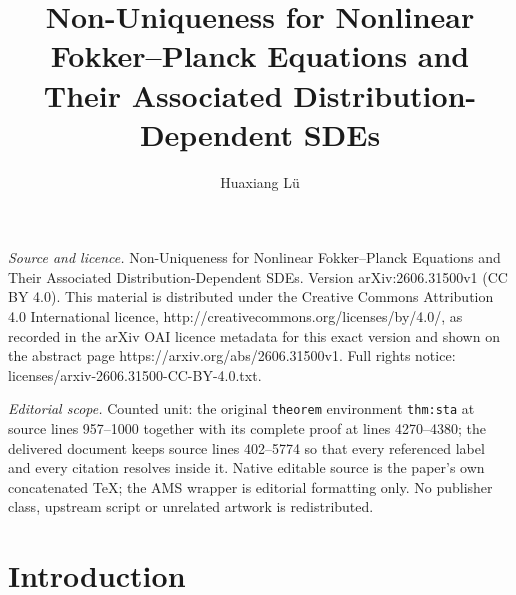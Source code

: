 \documentclass[10pt,a4paper]{amsart}
\numberwithin{equation}{section}
\begin{document}
\title[Non-Uniqueness for Nonlinear Fokker--Planck Equations and Th]{Non-Uniqueness for Nonlinear Fokker--Planck Equations and Their Associated Distribution-Dependent SDEs}
\author{Huaxiang Lü}
\date{}
\maketitle
\noindent\emph{Source and licence.} Non-Uniqueness for Nonlinear Fokker--Planck Equations and Their Associated Distribution-Dependent SDEs. Version arXiv:2606.31500v1 (CC BY 4.0). This material is distributed under the Creative Commons Attribution 4.0 International licence, http://creativecommons.org/licenses/by/4.0/, as recorded in the arXiv OAI licence metadata for this exact version and shown on the abstract page https://arxiv.org/abs/2606.31500v1. Full rights notice: licenses/arxiv-2606.31500-CC-BY-4.0.txt.\par\smallskip
\noindent\textit{Editorial scope.} Counted unit: the original \texttt{theorem} environment \texttt{thm:sta} at source lines 957--1000 together with its complete proof at lines 4270--4380; the delivered document keeps source lines 402--5774 so that every referenced label and every citation resolves inside it. Native editable source is the paper's own concatenated TeX; the AMS wrapper is editorial formatting only. No publisher class, upstream script or unrelated artwork is redistributed.
\section{Introduction}
\end{document}
